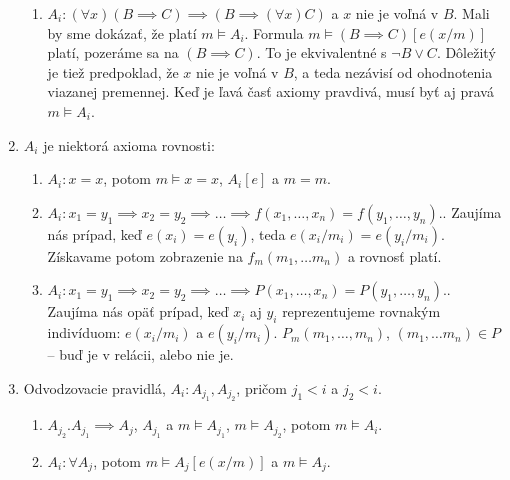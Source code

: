 \begin{dokaz}
\begin{enumerate}
\begin{enumerate}
        \item $A_i: (\forall x) (B \implies C) \implies (B \implies
        (\forall x) C)$ a $x$ nie je voľná v $B$. Mali by sme dokázať,
        že platí $m \models A_i$. Formula  $m \models (B \implies
        C)[e(x/m)]$ platí, pozeráme sa na $(B \implies C)$. To je
        ekvivalentné s $\neg B \lor C$. Dôležitý je tiež predpoklad, že
        $x$ nie je voľná v $B$, a teda nezávisí od ohodnotenia viazanej
        premennej. Keď je ľavá časť axiomy pravdivá, musí byť aj pravá
         $m \models A_i$.
        \end{enumerate}
    \item $A_i$ je niektorá axioma rovnosti:
        \begin{enumerate}
        \item $A_i: x=x$, potom $m\models x=x$, $A_i[e]$ a $m=m$.
        \item $A_i: x_1 = y_1 \implies x_2 = y_2 \implies \ldots \implies
        f(x_1, \ldots, x_n) = f(y_1, \ldots, y_n).$. Zaujíma nás prípad,
        keď  $e(x_i) = e(y_i)$, teda
        $e(x_i/m_i)=e(y_i/m_i)$.
        Získavame potom zobrazenie na
        $f_m(m_1, \ldots m_n)$ a rovnosť platí.
        \item $A_i: x_1 = y_1 \implies x_2 = y_2 \implies \ldots \implies
        P(x_1, \ldots, x_n) = P(y_1, \ldots, y_n).$. Zaujíma nás opäť
        prípad, keď $x_i$ aj $y_i$ reprezentujeme rovnakým indivíduom:
        $e(x_i/m_i)$ a $e(y_i/m_i)$.  $P_m(m_1, \ldots, m_n)$, $(m_1,
        \ldots m_n) \in P$ -- buď je v relácii, alebo nie je.
        \end{enumerate}
    \item Odvodzovacie pravidlá, $A_i: A_{j_1}, A_{j_2}$, pričom $j_1 < i$ a
            $j_2 < i$.
        \begin{enumerate}
        \item $A_{j_2}. A_{j_1} \implies A_j$, $A_{j_1}$ a $m \models
        A_{j_1}$, $m \models A_{j_2}$, potom $m \models A_i$.
        \item $A_i: \forall A_j$, potom $m \models A_j[e(x/m)]$ a $m
        \models A_j$.
        \end{enumerate}
    \end{enumerate}
\end{dokaz}

